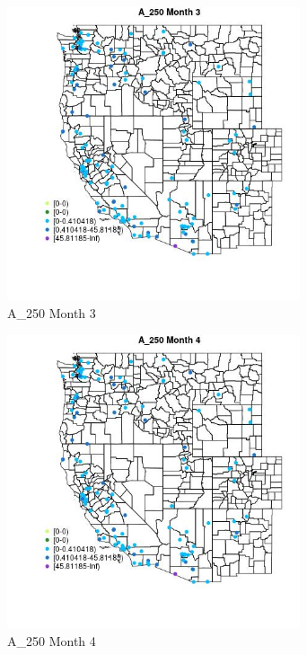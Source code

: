\begin{figure} 
\centering  
\includegraphics[width=0.77\textwidth]{Code_Outputs/Report_ML_input_PM25_Step4_part_e_de_duplicated_aves_MapObsMo3A_250.jpg} 
\caption{\label{fig:Report_ML_input_PM25_Step4_part_e_de_duplicated_avesMapObsMo3A_250}A_250 Month 3} 
\end{figure} 
 

\begin{figure} 
\centering  
\includegraphics[width=0.77\textwidth]{Code_Outputs/Report_ML_input_PM25_Step4_part_e_de_duplicated_aves_MapObsMo4A_250.jpg} 
\caption{\label{fig:Report_ML_input_PM25_Step4_part_e_de_duplicated_avesMapObsMo4A_250}A_250 Month 4} 
\end{figure} 
 

